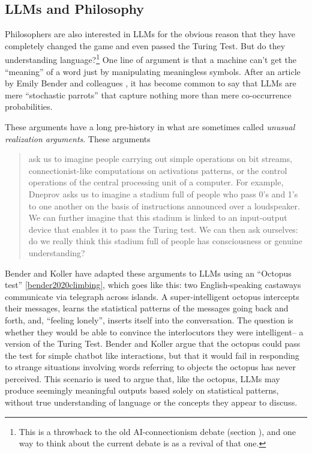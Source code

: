\subsection{LLMs and Philosophy}\label{llmPhilosophy}

Philosophers are also interested in LLMs for the obvious reason that they have completely changed the game and even passed the Turing Test. But do they understanding language?\footnote{This is a throwback to the old AI-connectionism debate (section ), and one way to think about the current debate is as a revival of that one.} One line of argument is that a machine can’t get the ``meaning'' of a word just by manipulating meaningless symbols. After an article by Emily Bender and colleagues \cite{bender2021dangers}, it has become common to say that LLMs are mere ``stochastic parrots'' that capture nothing more than mere co-occurrence probabilities. 

These arguments have a long pre-history in what are sometimes called \emph{unusual realization arguments}. These arguments
\begin{quote}
ask us to imagine people carrying out simple operations on bit streams, connectionist-like computations on activations patterns, or the control operations of the central processing unit of a computer. For example, Dneprov asks us to imagine a stadium full of people who pass 0’s and 1’s to one another on the basis of instructions announced over a loudspeaker. We can further imagine that this stadium is linked to an input-output device that enables it to pass the Turing test. We can then ask ourselves: do we really think this stadium full of people has consciousness or genuine understanding? \cite{noelle2022artificial}
\end{quote}

Bender and Koller have adapted these arguments to LLMs using an ``Octopus test'' \ref{bender2020climbing}, which goes like this: two English-speaking castaways communicate via telegraph across islands. A super-intelligent octopus intercepts their messages, learns the statistical patterns of the messages going back and forth, and, ``feeling lonely'', inserts itself into the conversation. The question is whether they would be able to convince the interlocutors they were intelligent-- a version of the Turing Test. Bender and Koller argue that the octopus could pass the test for simple chatbot like interactions, but that it would fail in responding to strange situations involving words referring to objects the octopus has never perceived. This scenario is used to argue that, like the octopus, LLMs may produce seemingly meaningful outputs based solely on statistical patterns, without true understanding of language or the concepts they appear to discuss.

